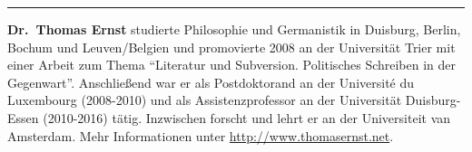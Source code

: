 \begin{center}\rule{0.5\linewidth}{\linethickness}\end{center}

\textbf{Dr.~Thomas Ernst} studierte Philosophie und Germanistik in
Duisburg, Berlin, Bochum und Leuven/Belgien und promovierte 2008 an der
Universität Trier mit einer Arbeit zum Thema ``Literatur und Subversion.
Politisches Schreiben in der Gegenwart''. Anschließend war er als
Postdoktorand an der Université du Luxembourg (2008-2010) und als
Assistenzprofessor an der Universität Duisburg-Essen (2010-2016) tätig.
Inzwischen forscht und lehrt er an der Universiteit van Amsterdam. Mehr
Informationen unter \url{http://www.thomasernst.net}.
